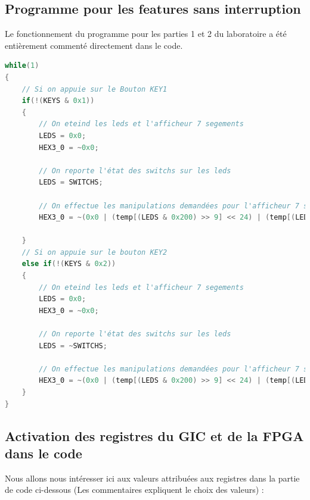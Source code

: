 \subsection{Programme pour les features sans interruption}
Le fonctionnement du programme pour les parties 1 et 2 du laboratoire a été entièrement commenté directement dans le code. \\
\begin{lstlisting}[language=C]
    while(1)
{
	// Si on appuie sur le Bouton KEY1
	if(!(KEYS & 0x1))
	{
		// On eteind les leds et l'afficheur 7 segements
		LEDS = 0x0;
		HEX3_0 = ~0x0;
		
		// On reporte l'état des switchs sur les leds
		LEDS = SWITCHS;
		
		// On effectue les manipulations demandées pour l'afficheur 7 segements pour KEY1
		HEX3_0 = ~(0x0 | (temp[(LEDS & 0x200) >> 9] << 24) | (temp[(LEDS & 0x100) >> 8] << 16) | (temp[(LEDS & 0xF0) >> 4 ] << 8) | (temp[(LEDS & 0xF)]));
	
	}
	// Si on appuie sur le bouton KEY2
	else if(!(KEYS & 0x2))
	{
		// On eteind les leds et l'afficheur 7 segements
		LEDS = 0x0;
		HEX3_0 = ~0x0;
		
		// On reporte l'état des switchs sur les leds
		LEDS = ~SWITCHS;
		
		// On effectue les manipulations demandées pour l'afficheur 7 segements pour KEY2
		HEX3_0 = ~(0x0 | (temp[(LEDS & 0x200) >> 9] << 24) | (temp[(LEDS & 0x100) >> 8] << 16) | (temp[(LEDS & 0xF0) >> 4 ] << 8) | (temp[(LEDS & 0xF)]));
	}
}
\end{lstlisting}

\subsection{Activation des registres du GIC et de la FPGA dans le code }
Nous allons nous intéresser ici aux valeurs attribuées aux registres dans la partie de code ci-dessous (Les commentaires expliquent le choix des valeurs) : \\

